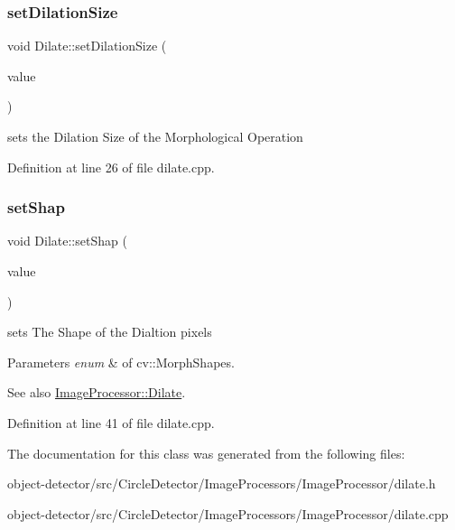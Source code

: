\subsubsection{\texorpdfstring{set\+Dilation\+Size}{setDilationSize}}
{\footnotesize\ttfamily void Dilate\+::set\+Dilation\+Size (\begin{DoxyParamCaption}\item[{int}]{value }\end{DoxyParamCaption})\hspace{0.3cm}{\ttfamily [slot]}}



sets the Dilation Size of the Morphological Operation 



Definition at line 26 of file dilate.\+cpp.

\mbox{\label{class_image_processor_1_1_dilate_a675b54d7fa85c5bce578a625a1f8ec38}} 
\subsubsection{\texorpdfstring{set\+Shap}{setShap}}
{\footnotesize\ttfamily void Dilate\+::set\+Shap (\begin{DoxyParamCaption}\item[{const cv\+::\+Morph\+Shapes \&}]{value }\end{DoxyParamCaption})\hspace{0.3cm}{\ttfamily [slot]}}



sets The Shape of the Dialtion pixels 


\begin{DoxyParams}{Parameters}
{\em enum} & of cv\+::\+Morph\+Shapes. \\
\hline
\end{DoxyParams}
\begin{DoxySeeAlso}{See also}
\hyperlink{class_image_processor_1_1_dilate}{Image\+Processor\+::\+Dilate}. 
\end{DoxySeeAlso}


Definition at line 41 of file dilate.\+cpp.



The documentation for this class was generated from the following files\+:\begin{DoxyCompactItemize}
\item 
object-\/detector/src/\+Circle\+Detector/\+Image\+Processors/\+Image\+Processor/dilate.\+h\item 
object-\/detector/src/\+Circle\+Detector/\+Image\+Processors/\+Image\+Processor/dilate.\+cpp\end{DoxyCompactItemize}
